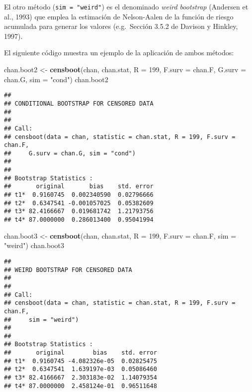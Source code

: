 \documentclass[
]{book}
\newenvironment{Shaded}{\begin{snugshade}}{\end{snugshade}}
\newcommand{\DataTypeTok}[1]{\textcolor[rgb]{0.13,0.29,0.53}{#1}}
\newcommand{\DecValTok}[1]{\textcolor[rgb]{0.00,0.00,0.81}{#1}}
\newcommand{\KeywordTok}[1]{\textcolor[rgb]{0.13,0.29,0.53}{\textbf{#1}}}
\newcommand{\NormalTok}[1]{#1}
\newcommand{\StringTok}[1]{\textcolor[rgb]{0.31,0.60,0.02}{#1}}
\theoremstyle{break}
\theoremstyle{definition}
\theoremstyle{definition}
\theoremstyle{definition}
\theoremstyle{remark}
\begin{document}
El otro método (\texttt{sim\ =\ "weird"}) es el denominado \emph{weird bootstrap}
(Andersen et al., 1993) que emplea la estimación de Nelson-Aalen de la
función de riesgo acumulada para generar los valores
(e.g.~Sección 3.5.2 de Davison y Hinkley, 1997).

El siguiente código muestra un ejemplo de la aplicación de ambos métodos:

\begin{Shaded}
\begin{Highlighting}[]
\NormalTok{chan.boot2 <-}\StringTok{ }\KeywordTok{censboot}\NormalTok{(chan, chan.stat, }\DataTypeTok{R =} \DecValTok{199}\NormalTok{, }\DataTypeTok{F.surv =}\NormalTok{ chan.F, }
                  \DataTypeTok{G.surv =}\NormalTok{ chan.G, }\DataTypeTok{sim =} \StringTok{"cond"}\NormalTok{)}
\NormalTok{chan.boot2}
\end{Highlighting}
\end{Shaded}

\begin{verbatim}
## 
## CONDITIONAL BOOTSTRAP FOR CENSORED DATA
## 
## 
## Call:
## censboot(data = chan, statistic = chan.stat, R = 199, F.surv = chan.F, 
##     G.surv = chan.G, sim = "cond")
## 
## 
## Bootstrap Statistics :
##       original       bias    std. error
## t1*  0.9160745  0.002340590  0.02796666
## t2*  0.6347541 -0.001057025  0.05382609
## t3* 82.4166667  0.019681742  1.21793756
## t4* 87.0000000  0.286013400  0.95041994
\end{verbatim}

\begin{Shaded}
\begin{Highlighting}[]
\NormalTok{chan.boot3 <-}\StringTok{ }\KeywordTok{censboot}\NormalTok{(chan, chan.stat, }\DataTypeTok{R =} \DecValTok{199}\NormalTok{, }\DataTypeTok{F.surv =}\NormalTok{ chan.F, }
                  \DataTypeTok{sim =} \StringTok{"weird"}\NormalTok{)}
\NormalTok{chan.boot3}
\end{Highlighting}
\end{Shaded}

\begin{verbatim}
## 
## WEIRD BOOTSTRAP FOR CENSORED DATA
## 
## 
## Call:
## censboot(data = chan, statistic = chan.stat, R = 199, F.surv = chan.F, 
##     sim = "weird")
## 
## 
## Bootstrap Statistics :
##       original        bias    std. error
## t1*  0.9160745 -4.082326e-05  0.02825475
## t2*  0.6347541  1.639197e-03  0.05086460
## t3* 82.4166667  2.303183e-02  1.14079354
## t4* 87.0000000  2.458124e-01  0.96511648
\end{verbatim}
\end{document}
